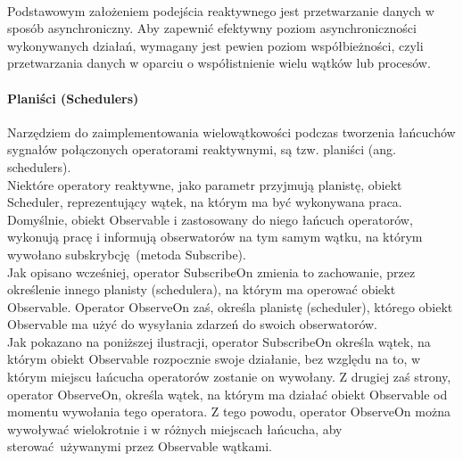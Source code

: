 \documentclass[12pt,oneside,a4paper]{report}
\begin{document}
\paragraph{}Podstawowym założeniem podejścia reaktywnego jest przetwarzanie danych w sposób asynchroniczny. Aby zapewnić efektywny poziom asynchroniczności wykonywanych działań, wymagany jest pewien poziom współbieżności, czyli przetwarzania danych w oparciu o współistnienie wielu wątków lub procesów.
\paragraph{Planiści (Schedulers)}
Narzędziem do zaimplementowania wielowątkowości podczas tworzenia łańcuchów sygnałów połączonych operatorami reaktywnymi, są tzw. planiści (ang. schedulers).\\
Niektóre operatory reaktywne, jako parametr przyjmują planistę, obiekt Scheduler, reprezentujący wątek, na którym ma być wykonywana praca.\\
Domyślnie, obiekt Observable i zastosowany do niego łańcuch operatorów, wykonują pracę i informują obserwatorów na tym samym wątku, na którym wywołano subskrybcję (metoda Subscribe).\\
Jak opisano wcześniej, operator SubscribeOn zmienia to zachowanie, przez określenie innego planisty (schedulera), na którym ma operować obiekt Observable. Operator ObserveOn zaś, określa planistę (scheduler), którego obiekt Observable ma użyć do wysyłania zdarzeń do swoich obserwatorów.\\
Jak pokazano na poniższej ilustracji, operator SubscribeOn określa wątek, na którym obiekt Observable rozpocznie swoje działanie, bez względu na to, w którym miejscu łańcucha operatorów zostanie on wywołany. Z drugiej zaś strony, operator ObserveOn, określa wątek, na którym ma działać obiekt Observable od momentu wywołania tego operatora. Z tego powodu, operator ObserveOn można wywoływać wielokrotnie i w różnych miejscach łańcucha, aby sterować używanymi przez Observable wątkami. 
\end{document}
